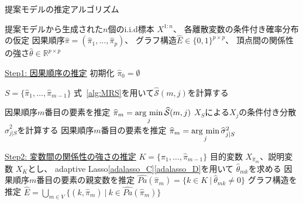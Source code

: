 \begin{algorithm}[t]
    \caption{提案モデルの推定アルゴリズム}
    \label{alg1}
    \begin{algorithmic}    %
      \REQUIRE 提案モデルから生成された$n$個のi.i.d標本 $X^{1:n}$、
               各離散変数の条件付き確率分布の仮定
      \ENSURE 因果順序$\widehat{\pi}=(\widehat{\pi}_1, \dots, \widehat{\pi}_p)$、
              グラフ構造$\widehat{E} \in \{ 0,1\}^{p \times p}$、
              頂点間の関係性の強さ$\widehat{\theta} \in \mathbb R^{p \times p}$

      \STATE \underline{Step1: 因果順序の推定}
      \STATE 初期化 $\widehat{\pi}_0 = \emptyset$

      \STATE $S = \{ \widehat{\pi}_1, \dots, \widehat{\pi}_{m-1} \}$
        \STATE 式~\eqref{alg:MRS}を用いて$\widehat{\mathcal S}(m,j)$を計算する
        \ENDFOR

        \STATE 因果順序$m$番目の要素を推定 $\widehat{\pi}_m = \mathop{\rm arg~min}\limits_{j} \widehat{\mathcal S}(m,j)$
        \ELSE
          \STATE $X_S$による$X_j$の条件付き分散 $\widehat{\sigma}_{j|S}^2$を計算する
          \ENDFOR
        \STATE 因果順序$m$番目の要素を推定 $\widehat{\pi}_m = \mathop{\rm arg~min}\limits_{j} \widehat{\sigma}_{j|S}^2$
        \ENDIF
      \ENDFOR

      \STATE \underline{Step2: 変数間の関係性の強さの推定}
      \STATE $K = \{ \widehat{\pi}_1, \dots, \widehat{\pi}_{m-1} \}$
      \STATE 目的変数 $X_{\widehat{\pi}_m}$、説明変数 $X_K$とし、
             adaptive Lasso\eqref{adalasso_C}\eqref{adalasso_D}を用いて
             $\widehat{\theta}_{mk}$を求める
      \STATE 因果順序$m$番目の要素の親変数を推定
             $\widehat{Pa}(\widehat{\pi}_m) = \{ k \in K \>|\> \widehat{\theta}_{mk} \neq 0 \}$
      \ENDFOR
      \STATE グラフ構造を推定
      $\widehat{E} = \bigcup_{m\in V}\{ (k,\widehat{\pi}_m)
      \>|\> k \in \widehat{Pa}(\widehat{\pi}_m) \}$

    \end{algorithmic}
\end{algorithm}
